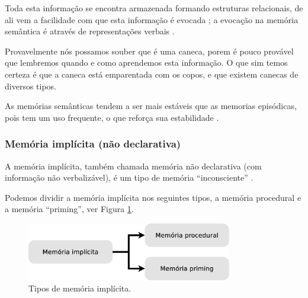 \begin{itemize}
Toda esta informação se encontra armazenada formando estruturas relacionais, 
de ali vem a facilidade com que esta informação é evocada
\cite[pp. 34]{de2000comprension};
a  evocação na memória semântica é através de representações verbais
\cite[pp. 35]{de2000comprension}.
\begin{example}
Provavelmente nós possamos souber que é uma caneca, 
porem é pouco provável que lembremos quando e como aprendemos esta informação.
O que sim temos  certeza é que a caneca está emparentada com os copos, e que existem canecas de diversos tipos.
\end{example}
As memórias semânticas tendem a ser mais estáveis que as memorias episódicas,
pois tem um uso frequente, o que reforça sua estabilidade \cite[pp. 140]{pake2019psicologia}.
\end{itemize}


\subsubsection{Memória implícita (não declarativa)} 
\label{subsubsec:implicita}
A memória implícita, também chamada memória não declarativa (com informação não verbalizável),
é um tipo de memória ``inconsciente''
\cite[pp. 140]{pake2019psicologia}.

Podemos dividir a memória implícita nos seguintes tipos, 
a memória procedural e 
a memória ``priming'', ver Figura \ref{fig:semantica-episodica}.
\begin{figure}[!h]
  \centering
    \includegraphics[width=0.8\textwidth]{chapters/cap-learning/memory-implicita.eps} 
  \caption{Tipos de  memória implícita.}
\label{fig:semantica-episodica}
\end{figure}

